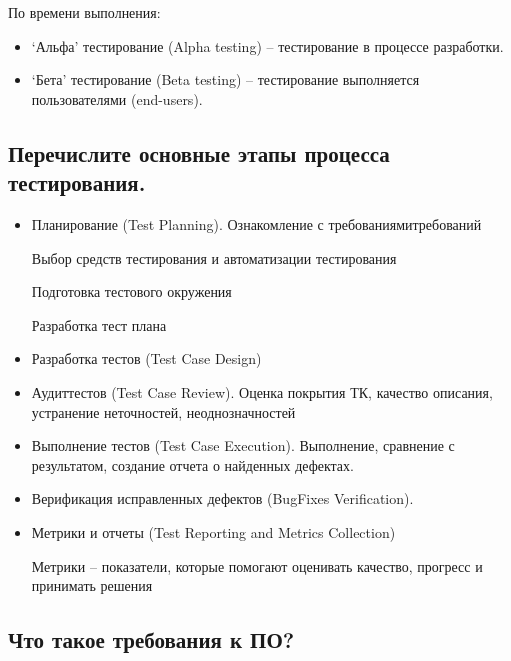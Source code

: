 По времени выполнения:

\begin{itemize}
    \item ‘Альфа’ тестирование (Alpha testing) – тестирование в процессе разработки. 

    \item ‘Бета’ тестирование (Beta testing) – тестирование выполняется пользователями
        (end-users).
\end{itemize}

\subsection{Перечислите основные этапы процесса тестирования.}

\begin{itemize}
    \item Планирование (Test Planning).
        Ознакомление с требованиями требований

        Выбор средств тестирования и автоматизации тестирования

        Подготовка тестового окружения

        Разработка тест плана

        
    \item Разработка тестов (Test Case Design)

    \item Аудит тестов (Test Case Review). Оценка покрытия ТК, качество
        описания, устранение неточностей, неоднозначностей

    \item Выполнение тестов (Test Case Execution). Выполнение, сравнение с
        результатом, создание отчета о найденных дефектах.

    \item Верификация исправленных дефектов (Bug\Defects Fixes Verification). 

    \item Метрики и отчеты (Test Reporting and Metrics Collection)

        Метрики – показатели, которые помогают оценивать качество, прогресс и
        принимать решения
\end{itemize}

\subsection{Что такое требования к ПО? }

